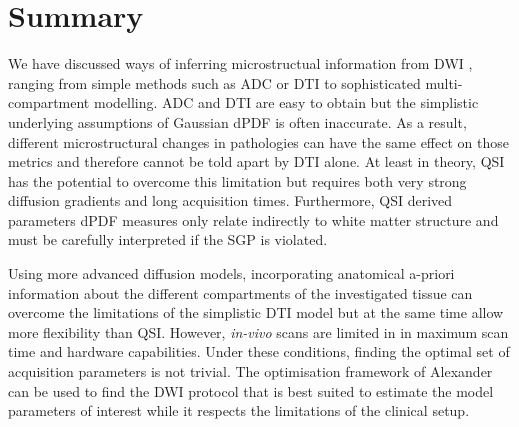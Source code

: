 
 
\section{Summary}
We have discussed ways of inferring microstructual information from  {\gls{DWI}} , ranging from simple methods such as \gls{ADC} or \gls{DTI} to sophisticated multi-compartment modelling. \gls{ADC} and \gls{DTI} are easy to obtain but the simplistic underlying assumptions of Gaussian  {\gls{dPDF}} is often inaccurate. As a result, different microstructural changes in pathologies can have the same effect on those metrics and therefore cannot be told apart by \gls{DTI} alone. At least in theory, \gls{QSI} has the potential to overcome this limitation but requires both very strong diffusion gradients and long acquisition times. Furthermore, \gls{QSI} derived parameters  {\gls{dPDF}} measures only relate indirectly to white matter structure and must be carefully interpreted if the SGP is violated.


Using more advanced diffusion models, incorporating anatomical a-priori information about the different compartments of the investigated tissue can overcome the limitations of the simplistic \gls{DTI} model but at the same time allow more flexibility than \gls{QSI}. However, \emph{in-vivo} scans are limited in in maximum scan time and hardware capabilities. Under these conditions, finding the optimal set of acquisition parameters is not trivial. The optimisation framework of Alexander can be used to find the  {\gls{DWI}}  protocol that is best suited to estimate the model parameters of interest while it respects the limitations of the clinical setup.  
